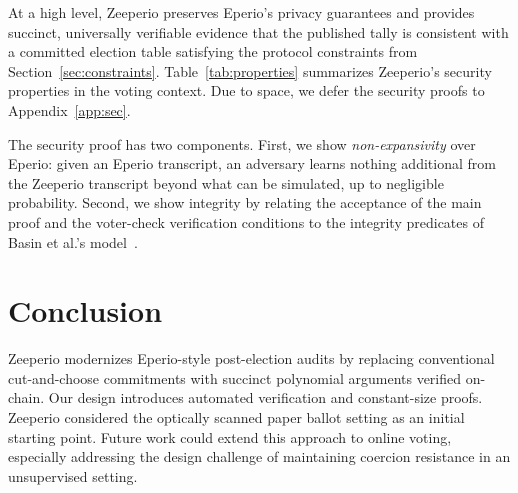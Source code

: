 At a high level, Zeeperio preserves Eperio's privacy guarantees and provides succinct,
universally verifiable evidence that the published tally is consistent with a committed election
table satisfying the protocol constraints from Section~\ref{sec:constraints}.
Table~\ref{tab:properties} summarizes Zeeperio's security properties in the voting context. Due to space, we defer the security proofs to Appendix~\ref{app:sec}. 

The security proof has two components. First, we show \emph{non-expansivity} over Eperio: given an Eperio transcript, an adversary
learns nothing additional from the Zeeperio transcript beyond what can be simulated, up to negligible
probability. Second, we show integrity by relating the acceptance of the main proof and the voter-check
verification conditions to the integrity predicates of Basin et al.'s model~\cite{BDGR21}.


\section{Conclusion}
Zeeperio modernizes Eperio-style post-election audits by replacing conventional cut-and-choose commitments with succinct polynomial arguments verified on-chain. Our design introduces automated verification and constant-size proofs. Zeeperio considered the optically scanned paper ballot setting as an initial starting point. Future work could extend this approach to online voting, especially addressing the design challenge of maintaining coercion resistance in an unsupervised setting. 





